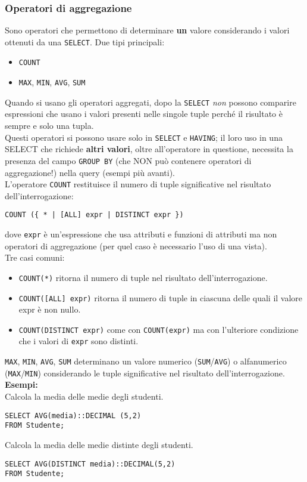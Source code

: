\documentclass[a4paper, 10pt, titlepage]{article}
\begin{document}
	\subsubsection{Operatori di aggregazione}
		Sono operatori che permettono di determinare \textbf{un} valore considerando i
		valori ottenuti da una \lstinline|SELECT|.
		Due tipi principali:
		\begin{itemize}
			\item \lstinline|COUNT|
			\item \lstinline|MAX|, \lstinline|MIN|, \lstinline|AVG|, \lstinline|SUM|
		\end{itemize}
		Quando si usano gli operatori aggregati, dopo la \lstinline|SELECT| \textit{non} possono
		comparire espressioni che usano i valori presenti nelle singole tuple
		perché il risultato è sempre e solo una tupla. \\
		Questi operatori si possono usare solo in \lstinline|SELECT| e \lstinline|HAVING|; il loro uso in una SELECT che richiede \textbf{altri valori}, oltre all'operatore in questione, necessita la presenza del campo \lstinline|GROUP BY| (che NON può contenere operatori di aggregazione!) nella query (esempi più avanti). \bigskip \\
		L'operatore \lstinline|COUNT| restituisce il numero di tuple significative nel risultato dell’interrogazione:
		\begin{lstlisting}
COUNT ({ * | [ALL] expr | DISTINCT expr })
		\end{lstlisting}
		dove \lstinline|expr| è un’espressione che usa attributi e funzioni di attributi ma non
		operatori di aggregazione (per quel caso è necessario l'uso di una vista).\\
		Tre casi comuni:
		\begin{itemize}
			\item \lstinline|COUNT(*)| ritorna il numero di tuple nel risultato dell’interrogazione.
			\item \lstinline|COUNT([ALL] expr)| ritorna il numero di tuple in ciascuna delle quali il valore
			expr è non nullo.
			\item \lstinline|COUNT(DISTINCT expr)| come con \lstinline|COUNT(expr)| ma con l’ulteriore
			condizione che i valori di \lstinline|expr| sono distinti.
		\end{itemize} \medskip
		\lstinline|MAX|, \lstinline|MIN|, \lstinline|AVG|, \lstinline|SUM| determinano un valore numerico (\lstinline|SUM|/\lstinline|AVG|) o alfanumerico (\lstinline|MAX|/\lstinline|MIN|)
		considerando le tuple significative nel risultato dell’interrogazione.\medskip \\ 
		\textbf{Esempi: }\\
		Calcola la media delle medie degli studenti.
		\begin{lstlisting}
SELECT AVG(media)::DECIMAL (5,2)
FROM Studente;
		\end{lstlisting}
		Calcola la media delle medie distinte degli studenti.
		\begin{lstlisting}
SELECT AVG(DISTINCT media)::DECIMAL(5,2)
FROM Studente;
		\end{lstlisting}
		
\end{document}
